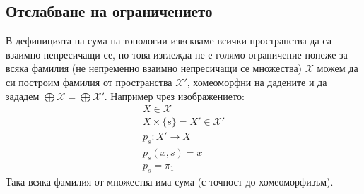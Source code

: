 \subsection{Отслабване на ограничението}
В дефиницията на сума на топологии изискваме всички пространства да са взаимно непресичащи се, но това изглежда не е голямо ограничение понеже за всяка фамилия (не непременно взаимно непресичащи се множества) $\mathcal X$ можем да си построим фамилия от пространства $\mathcal X'$, хомеоморфни на дадените и да зададем $\bigoplus \mathcal X = \bigoplus \mathcal X'$. Например чрез изображението:
\begin{equation}
    \begin{split}
        X \in \mathcal X                    \\
        X \times \{s\} = X' \in \mathcal X' \\
        p_s : X' \to X                      \\
        p_s(x, s) = x                       \\
        p_s = \pi_1
    \end{split}
\end{equation}
Така всяка фамилия от множества има сума (с точност до хомеоморфизъм).